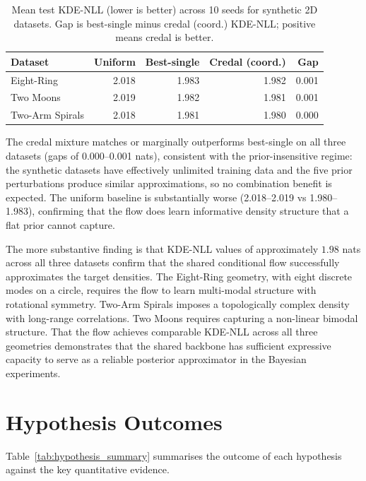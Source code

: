\begin{table}[h]
\centering
\caption{Mean test KDE-NLL (lower is 
better) across 10 seeds for synthetic 
2D datasets. Gap is best-single minus 
credal (coord.) KDE-NLL; positive 
means credal is better.}
\label{tab:synthetic}
{\singlespacing
\begin{tabular}{lrrrr}
\hline
Dataset & Uniform & Best-single 
& Credal (coord.) & Gap \\
\hline
Eight-Ring   & 2.018 & 1.983 
             & 1.982 & 0.001 \\
Two Moons    & 2.019 & 1.982 
             & 1.981 & 0.001 \\
Two-Arm Spirals & 2.018 & 1.981 
             & 1.980 & 0.000 \\
\hline
\end{tabular}}
\end{table}

The credal mixture matches or 
marginally outperforms best-single 
on all three datasets (gaps of 
0.000--0.001 nats), consistent with 
the prior-insensitive regime: the 
synthetic datasets have effectively 
unlimited training data and the 
five prior perturbations produce 
similar approximations, so no 
combination benefit is expected. 
The uniform baseline is substantially 
worse (2.018--2.019 vs 1.980--1.983), 
confirming that the flow does learn 
informative density structure that 
a flat prior cannot capture.

The more substantive finding is that 
KDE-NLL values of approximately 
$1.98$ nats across all three datasets 
confirm that the shared conditional 
flow successfully approximates 
the target densities. The Eight-Ring 
geometry, with eight discrete modes 
on a circle, requires the flow to 
learn multi-modal structure with 
rotational symmetry. Two-Arm Spirals 
imposes a topologically complex 
density with long-range correlations. 
Two Moons requires capturing a 
non-linear bimodal structure. That 
the flow achieves comparable 
KDE-NLL across all three geometries 
demonstrates that the shared 
backbone has sufficient expressive 
capacity to serve as a reliable 
posterior approximator in the 
Bayesian experiments.

\section{Hypothesis Outcomes}
\label{sec:hypothesis_summary}

Table~\ref{tab:hypothesis_summary} 
summarises the outcome of each 
hypothesis against the key 
quantitative evidence.

